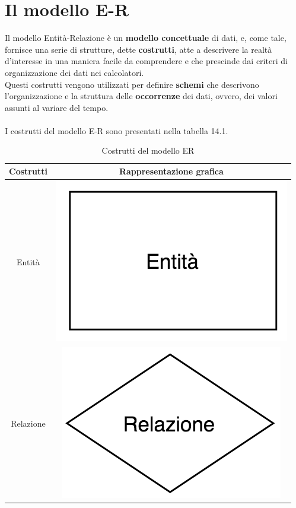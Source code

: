 \section{Il modello E-R}
Il modello Entità-Relazione è un \textbf{modello concettuale} di dati, e, come tale, fornisce una serie di strutture, dette \textbf{costrutti}, atte a descrivere la realtà d'interesse in una maniera facile da comprendere e che prescinde dai criteri di organizzazione dei dati nei calcolatori.\\
Questi costrutti vengono utilizzati per definire \textbf{schemi} che descrivono l'organizzazione e la struttura delle \textbf{occorrenze} dei dati, ovvero, dei valori assunti al variare del tempo.\\\\
I costrutti del modello E-R sono presentati nella tabella 14.1.
    \begin{table}\caption{Costrutti del modello ER}
        \begin{center}\begin{tabular}{|c|c|} \hline
        \textbf{Costrutti} & \textbf{Rappresentazione grafica}\\ \hline
        Entità & \includegraphics[scale = 0.4]{13/img0}  \\ \hline
        Relazione & \includegraphics[scale = 0.4]{13/img1}  \\ \hline

\end{tabular}
\end{center}
\end{table}
